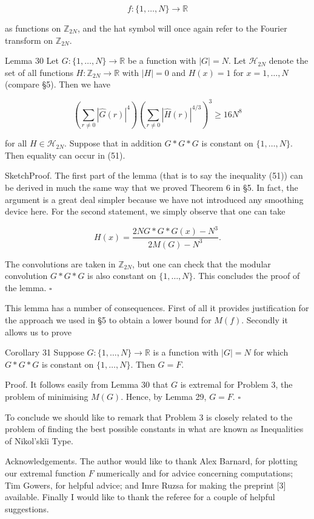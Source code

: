 \documentclass[10pt]{article}
\begin{document}
$$
f:\{1, \ldots, N\} \rightarrow \mathbb{R}
$$

as functions on $\mathbb{Z}_{2 N}$, and the hat symbol will once again refer to the Fourier transform on $\mathbb{Z}_{2 N}$.

Lemma 30 Let $G:\{1, \ldots, N\} \rightarrow \mathbb{R}$ be a function with $|G|=N$. Let $\mathcal{H}_{2 N}$ denote the set of all functions $H: \mathbb{Z}_{2 N} \rightarrow \mathbb{R}$ with $|H|=0$ and $H(x)=1$ for $x=1, \ldots, N$ (compare §5). Then we have


\begin{equation*}
\left(\sum_{r \neq 0}|\hat{G}(r)|^{4}\right)\left(\sum_{r \neq 0}|\hat{H}(r)|^{4 / 3}\right)^{3} \geq 16 N^{8} \tag{51}
\end{equation*}


for all $H \in \mathcal{H}_{2 N}$. Suppose that in addition $G * G * G$ is constant on $\{1, \ldots, N\}$. Then equality can occur in (51).

SketchProof. The first part of the lemma (that is to say the inequality (51)) can be derived in much the same way that we proved Theorem 6 in §5. In fact, the argument is a great deal simpler because we have not introduced any smoothing device here. For the second statement, we simply observe that one can take

$$
H(x)=\frac{2 N G * G * G(x)-N^{3}}{2 M(G)-N^{3}} .
$$

The convolutions are taken in $\mathbb{Z}_{2 N}$, but one can check that the modular convolution $G * G * G$ is also constant on $\{1, \ldots, N\}$. This concludes the proof of the lemma. \(\square\)

This lemma has a number of consequences. First of all it provides justification for the approach we used in §5 to obtain a lower bound for $M(f)$. Secondly it allows us to prove

Corollary 31 Suppose $G:\{1, \ldots, N\} \rightarrow \mathbb{R}$ is a function with $|G|=N$ for which $G * G * G$ is constant on $\{1, \ldots, N\}$. Then $G=F$.

Proof. It follows easily from Lemma 30 that $G$ is extremal for Problem 3, the problem of minimising $M(G)$. Hence, by Lemma 29, $G=F$. \(\square\)

To conclude we should like to remark that Problem 3 is closely related to the problem of finding the best possible constants in what are known as Inequalities of Nikol'skǐi Type.

Acknowledgements. The author would like to thank Alex Barnard, for plotting our extremal function $F$ numerically and for advice concerning computations; Tim Gowers, for helpful advice; and Imre Ruzsa for making the preprint [3] available. Finally I would like to thank the referee for a couple of helpful suggestions.
\end{document}
